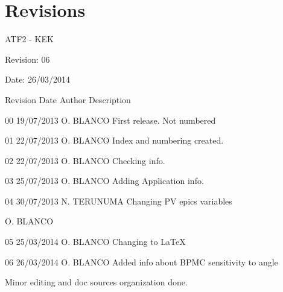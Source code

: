 \section{Revisions}
ATF2 - KEK\par
Revision: 06\par
Date: 26/03/2014\par
\vspace*{0.5cm}
Revision	Date			Author		Description\par 
00		19/07/2013	O. BLANCO	First release. Not numbered\par 
01		22/07/2013	O. BLANCO	Index and numbering created.\par 
02		22/07/2013	O. BLANCO	Checking info.\par 
03		25/07/2013	O. BLANCO	Adding Application info.\par 
04		30/07/2013	N. TERUNUMA	Changing PV epics variables\par 
\hspace*{3cm}					O. BLANCO\par 
05		25/03/2014	O. BLANCO	Changing to \LaTeX\par
06		26/03/2014	O. BLANCO	Added info about BPMC sensitivity to angle\par
\hspace*{4cm} Minor editing and doc sources organization done.
